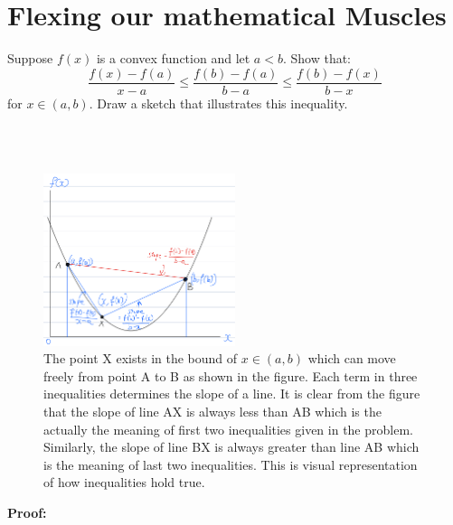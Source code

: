 \documentclass[a4paper,10pt]{article}
\begin{document}
\section{Flexing our mathematical Muscles}
\begin{enumerate}

    \begin{taskbox}
    Suppose $f(x)$ is a convex function and let $a<b$. Show that:
    \begin{equation}
        \frac{f(x)-f(a)}{x-a} \leq \frac{f(b)-f(a)}{b-a} \leq \frac{f(b)-f(x)}{b-x}
    \end{equation}
    for $x\in(a,b)$. Draw a sketch that illustrates this inequality.
    \end{taskbox}

   \\\\
   \begin{figure}[!htbp]
    \centering
    \includegraphics[width=0.5\textwidth]{images/graph.png}
    \caption{\label{fig:graph} The point X exists in the bound of $x \in (a,b)$ which can move freely from point A to B as shown in the figure. Each term in three inequalities determines the slope of a line. It is clear from the figure that the slope of line AX is always less than AB which is the actually the meaning of first two inequalities given in the problem. Similarly, the slope of line BX is always greater than line AB which is the meaning of last two inequalities. This is visual representation of how inequalities hold true.}
    \end{figure}
    \newpage
   \textbf{Proof:}
   \\
 

\end{enumerate}
\end{document}
